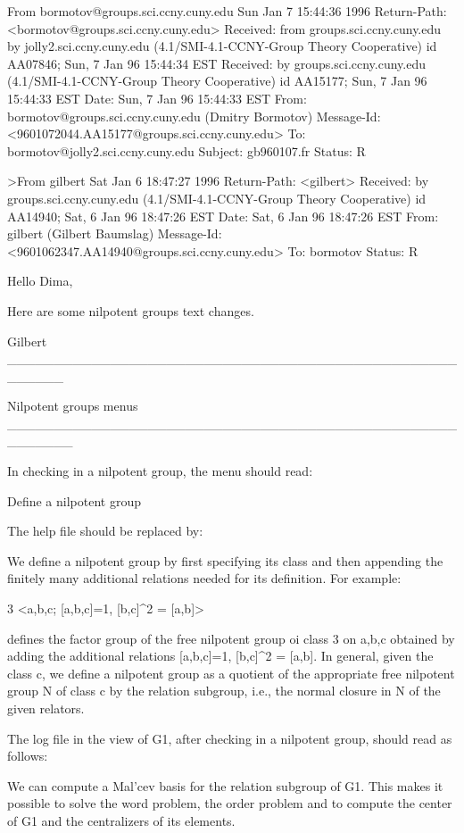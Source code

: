 From bormotov@groups.sci.ccny.cuny.edu Sun Jan  7 15:44:36 1996
Return-Path: <bormotov@groups.sci.ccny.cuny.edu>
Received: from groups.sci.ccny.cuny.edu by jolly2.sci.ccny.cuny.edu (4.1/SMI-4.1-CCNY-Group Theory Cooperative)
	id AA07846; Sun, 7 Jan 96 15:44:34 EST
Received: by groups.sci.ccny.cuny.edu (4.1/SMI-4.1-CCNY-Group Theory Cooperative)
	id AA15177; Sun, 7 Jan 96 15:44:33 EST
Date: Sun, 7 Jan 96 15:44:33 EST
From: bormotov@groups.sci.ccny.cuny.edu (Dmitry Bormotov)
Message-Id: <9601072044.AA15177@groups.sci.ccny.cuny.edu>
To: bormotov@jolly2.sci.ccny.cuny.edu
Subject: gb960107.fr
Status: R

>From gilbert Sat Jan  6 18:47:27 1996
Return-Path: <gilbert>
Received: by groups.sci.ccny.cuny.edu (4.1/SMI-4.1-CCNY-Group Theory Cooperative)
	id AA14940; Sat, 6 Jan 96 18:47:26 EST
Date: Sat, 6 Jan 96 18:47:26 EST
From: gilbert (Gilbert Baumslag)
Message-Id: <9601062347.AA14940@groups.sci.ccny.cuny.edu>
To: bormotov
Status: R

Hello Dima,

Here are some nilpotent groups text changes.

Gilbert
______________________________________________________


Nilpotent groups menus
_______________________________________________________


In checking in a nilpotent group, the menu should read:

Define a nilpotent group

The help file should be replaced by:

We define a nilpotent group by first specifying its class
and then appending the finitely many additional relations 
needed for its definition. For example:

3 <a,b,c; [a,b,c]=1, [b,c]^2 = [a,b]>

defines the factor group of the free nilpotent group oi
class 3 on a,b,c obtained by adding the additional relations
[a,b,c]=1, [b,c]^2 = [a,b]. In general, given the class c,
we define a nilpotent group as a quotient of the appropriate
free nilpotent group N of class c by the relation subgroup, 
i.e., the normal closure in N of the given relators.

The log file in the view of G1, after checking in a nilpotent 
group, should read as follows:

We can compute a Mal'cev basis for the relation subgroup
of G1. This makes it possible to solve the word problem,
the order problem and to compute the center of G1 and the 
centralizers of its elements.

